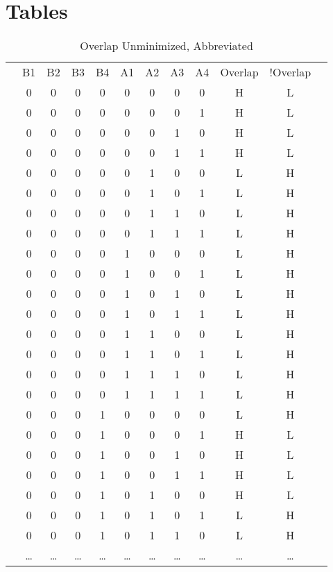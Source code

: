 \documentclass[letterpaper,titlepage,oneside]{article}
\begin{document}
\clearpage
\section{Tables}

\begin{table}[h!]
\begin{center}
\begin{tabular}{c|c|c|c|c|c|c|c|c|c|c|c}
\cline{2-11}

 & B1 & B2 & B3 & B4 & A1 & A2 & A3 & A4 & Overlap & !Overlap & \\ \cline{2-11}
 & 0 & 0 & 0 & 0 & 0 & 0 & 0 & 0 & H & L &   \\
 & 0 & 0 & 0 & 0 & 0 & 0 & 0 & 1 & H & L &   \\
 & 0 & 0 & 0 & 0 & 0 & 0 & 1 & 0 & H & L &   \\
 & 0 & 0 & 0 & 0 & 0 & 0 & 1 & 1 & H & L &   \\
 & 0 & 0 & 0 & 0 & 0 & 1 & 0 & 0 & L & H &   \\
 & 0 & 0 & 0 & 0 & 0 & 1 & 0 & 1 & L & H &   \\
 & 0 & 0 & 0 & 0 & 0 & 1 & 1 & 0 & L & H &   \\
 & 0 & 0 & 0 & 0 & 0 & 1 & 1 & 1 & L & H &   \\
 & 0 & 0 & 0 & 0 & 1 & 0 & 0 & 0 & L & H &   \\
 & 0 & 0 & 0 & 0 & 1 & 0 & 0 & 1 & L & H &   \\
 & 0 & 0 & 0 & 0 & 1 & 0 & 1 & 0 & L & H &   \\
 & 0 & 0 & 0 & 0 & 1 & 0 & 1 & 1 & L & H &   \\
 & 0 & 0 & 0 & 0 & 1 & 1 & 0 & 0 & L & H &   \\
 & 0 & 0 & 0 & 0 & 1 & 1 & 0 & 1 & L & H &   \\
 & 0 & 0 & 0 & 0 & 1 & 1 & 1 & 0 & L & H &   \\
 & 0 & 0 & 0 & 0 & 1 & 1 & 1 & 1 & L & H &   \\
 & 0 & 0 & 0 & 1 & 0 & 0 & 0 & 0 & L & H &   \\
 & 0 & 0 & 0 & 1 & 0 & 0 & 0 & 1 & H & L &   \\
 & 0 & 0 & 0 & 1 & 0 & 0 & 1 & 0 & H & L &   \\
 & 0 & 0 & 0 & 1 & 0 & 0 & 1 & 1 & H & L &   \\
 & 0 & 0 & 0 & 1 & 0 & 1 & 0 & 0 & H & L &   \\
 & 0 & 0 & 0 & 1 & 0 & 1 & 0 & 1 & L & H &   \\
 & 0 & 0 & 0 & 1 & 0 & 1 & 1 & 0 & L & H &   \\
 & \ldots & \ldots & \ldots & \ldots & \ldots & \ldots & \ldots & \ldots & \ldots & \ldots &  \\

\cline{2-11}
\end{tabular}
\caption{Overlap Unminimized, Abbreviated}\label{table:OverLap_Unminimized}

\end{center}
\end{table}
\end{document}
